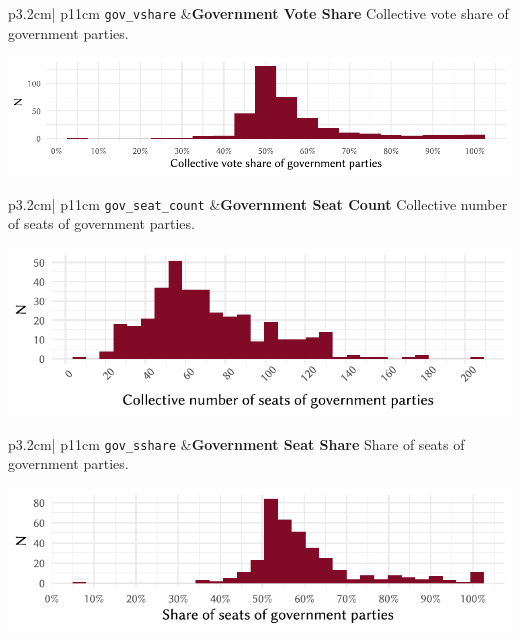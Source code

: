 \documentclass[
]{scrartcl}
\begin{document}
\begin{longtable}{p{3.2cm}| p{11cm}}
\texttt{gov\_vshare} &\textbf{Government Vote Share}\newline 
Collective vote share of government parties.

\hspace*{.25cm}
\begin{minipage}[t]{\linewidth }
\vspace{0pt}
\includegraphics[width = \linewidth]{cbfiles/gvsplot.pdf}
\end{minipage}


\end{longtable}

\begin{longtable}{p{3.2cm}| p{11cm}}
\texttt{gov\_seat\_count} &\textbf{Government Seat Count}\newline 
Collective number of seats of government parties.

\hspace*{.25cm}
\begin{minipage}[t]{\linewidth }
\vspace{0pt}
\includegraphics[width = \linewidth]{cbfiles/gscplot.pdf}
\end{minipage}


\end{longtable}

\begin{longtable}{p{3.2cm}| p{11cm}}
\texttt{gov\_sshare} &\textbf{Government Seat Share}\newline 
Share of seats of government parties.

\hspace*{.25cm}
\begin{minipage}[t]{\linewidth }
\vspace{0pt}
\includegraphics[width = \linewidth]{cbfiles/gssplot.pdf}
\end{minipage}


\end{longtable}
\end{document}
